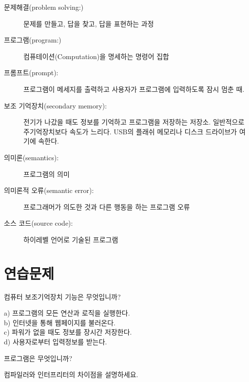 \begin{description}
\item[문제해결(problem solving:)] 문제를 만들고, 답을 찾고, 답을 표현하는 과정

\item[프로그램(program:)] 컴퓨테이션(Computation)을 명세하는 명령어 집합

\item[프롬프트(prompt):] 프로그램이 메세지를 출력하고 사용자가 프로그램에 입력하도록 잠시 멈춘 때.

\item[보조 기억장치(secondary memory):] 전기가 나갔을 때도 정보를 기억하고 프로그램을 저장하는 저장소. 
일반적으로 주기억장치보다 속도가 느리다. 
USB의 플래쉬 메모리나 디스크 드라이브가 여기에 속한다.

\item[의미론(semantics):]  프로그램의 의미

\item[의미론적 오류(semantic error):] 프로그래머가 의도한 것과 다른 행동을 하는 프로그램 오류

\item[소스 코드(source code):] 하이레벨 언어로 기술된 프로그램

\end{description}

\section{연습문제}


\begin{ex}
컴퓨터 보조기억장치 기능은 무엇입니까?

a) 프로그램의 모든 연산과 로직을 실행한다.\\
b) 인터넷을 통해 웹페이지를 불러온다.\\
c) 파워가 없을 때도 정보를 장시간 저장한다.\\
d) 사용자로부터 입력정보를 받는다.
\end{ex}

\begin{ex}
프로그램은 무엇입니까?
\end{ex}

\begin{ex}
컴파일러와 인터프리터의 차이점을 설명하세요.
\end{ex}

